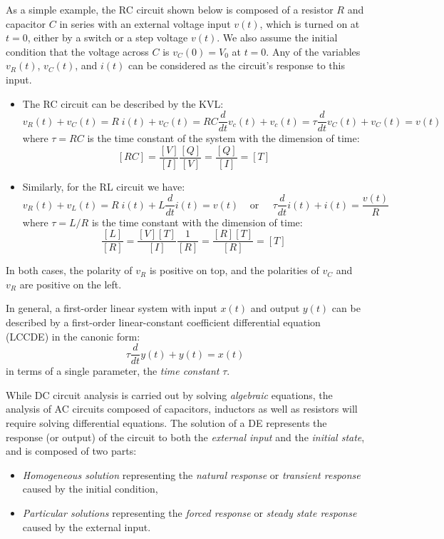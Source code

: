 As a simple example, the RC circuit shown below is composed of a resistor
$R$ and capacitor $C$ in series with an external voltage input $v(t)$, which 
is turned on at $t=0$, either by a switch or a step voltage $v(t)$. We also
assume the initial condition that the voltage across $C$ is $v_C(0)=V_0$ at
$t=0$. Any of the variables $v_R(t)$, $v_C(t)$, and $i(t)$ can be considered 
as the circuit's response to this input.


\begin{itemize}
\item The RC circuit can be described by the KVL:
  \[ 
  v_R(t)+v_C(t)=R\;i(t)+v_C(t)=RC\frac{d}{dt} v_c(t)+v_c(t)
  =\tau \frac{d}{dt} v_C(t)+v_C(t)=v(t) 
  \]
  where $\tau=RC$ is the time constant of the system with the dimension of time:
  \[
    [RC]=\frac{[V]}{[I]}\frac{[Q]}{[V]}=\frac{[Q]}{[I]}=[T]	
  \]
\item Similarly, for the RL circuit we have:
  \[
  v_R(t)+v_L(t)=R\; i(t)+L\frac{d}{dt} i(t)=v(t)\;\;\;\;\mbox{or}\;\;\;\;\;
  \tau \frac{d}{dt} i(t)+i(t)=\frac{v(t)}{R}	
  \]
  where $\tau=L/R$ is the time constant with the dimension of time:
  \[
    \frac{[L]}{[R]}=\frac{[V][T]}{[I]}\frac{1}{[R]}=\frac{[R][T]}{[R]}=[T]	
  \]
\end{itemize}
In both cases, the polarity of $v_R$ is positive on top, and the polarities of
$v_C$ and $v_R$ are positive on the left.

In general, a first-order linear system with input $x(t)$ and output
$y(t)$ can be described by a first-order linear-constant coefficient 
differential equation (LCCDE) in the canonic form:
\[
\tau\frac{d}{dt}y(t)+y(t)=x(t)
\]
in terms of a single parameter, the {\em time constant} $\tau$.

While DC circuit analysis is carried out by solving {\em algebraic} 
equations, the analysis of AC circuits composed of capacitors, inductors 
as well as resistors will require solving differential equations. The 
solution of a DE represents the response (or output) of the circuit to 
both the {\em external input} and the {\em initial state}, and is composed 
of two parts:
\begin{itemize}
\item {\em Homogeneous solution} representing the {\em natural response} or
  {\em transient response} caused by the initial condition,
\item {\em Particular solutions} representing the {\em forced response} or
  {\em steady state response} caused by the external input.
\end{itemize} 

